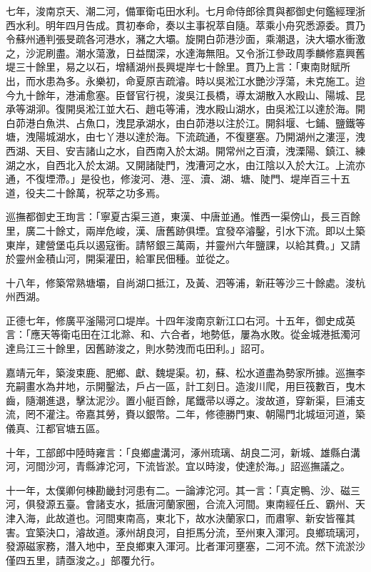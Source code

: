 七年，浚南京天、潮二河，備軍衛屯田水利。七月命侍郎徐貫與都御史何鑑經理浙西水利。明年四月告成。貫初奉命，奏以主事祝萃自隨。萃乘小舟究悉源委。貫乃令蘇州通判張旻疏各河港水，瀦之大壩。旋開白茆港沙面，乘潮退，決大壩水衝激之，沙泥刷盡。潮水蕩激，日益闊深，水達海無阻。又令浙江參政周季麟修嘉興舊堤三十餘里，易之以石，增繕湖州長興堤岸七十餘里。貫乃上言：「東南財賦所出，而水患為多。永樂初，命夏原吉疏濬。時以吳淞江水艷沙浮蕩，未克施工。迨今九十餘年，港浦愈塞。臣督官行視，浚吳江長橋，導太湖散入水殿山、陽城、昆承等湖泖。復開吳淞江並大石、趙屯等浦，洩水殿山湖水，由吳淞江以達於海。開白茆港白魚洪、占魚口，洩昆承湖水，由白茆港以注於江。開斜堰、七鋪、鹽鐵等塘，洩陽城湖水，由七丫港以達於海。下流疏通，不復壅塞。乃開湖州之漊涇，洩西湖、天目、安吉諸山之水，自西南入於太湖。開常州之百瀆，洩溧陽、鎮江、練湖之水，自西北入於太湖。又開諸陡門，洩漕河之水，由江陰以入於大江。上流亦通，不復堙滯。」是役也，修浚河、港、涇、瀆、湖、塘、陡門、堤岸百三十五道，役夫二十餘萬，祝萃之功多焉。

巡撫都御史王珣言：「寧夏古渠三道，東漢、中唐並通。惟西一渠傍山，長三百餘里，廣二十餘丈，兩岸危峻，漢、唐舊跡俱堙。宜發卒濬鑿，引水下流。即以土築東岸，建營堡屯兵以遏寇衝。請帑銀三萬兩，并靈州六年鹽課，以給其費。」又請於靈州金積山河，開渠灌田，給軍民佃種。並從之。

十八年，修築常熟塘壩，自尚湖口抵江，及黃、泗等浦，新莊等沙三十餘處。浚杭州西湖。

正德七年，修廣平滏陽河口堤岸。十四年浚南京新江口右河。十五年，御史成英言：「應天等衛屯田在江北滁、和、六合者，地勢低，屢為水敗。從金城港抵濁河達烏江三十餘里，因舊跡浚之，則水勢洩而屯田利。」詔可。

嘉靖元年，築浚束鹿、肥鄉、獻、魏堤渠。初，蘇、松水道盡為勢家所據。巡撫李充嗣畫水為井地，示開鑿法，戶占一區，計工刻日。造浚川爬，用巨筏數百，曳木齒，隨潮進退，擊汰泥沙。置小艇百餘，尾鐵帚以導之。浚故道，穿新渠，巨浦支流，罔不灌注。帝嘉其勞，賚以銀幣。二年，修德勝門東、朝陽門北城垣河道，築儀真、江都官塘五區。

十年，工部郎中陸時雍言：「良鄉盧溝河，涿州琉璃、胡良二河，新城、雄縣白溝河，河間沙河，青縣滹沱河，下流皆淤。宜以時浚，使達於海。」詔巡撫議之。

十一年，太僕卿何棟勘畿封河患有二。一論滹沱河。其一言：「真定鴨、沙、磁三河，俱發源五臺。會諸支水，抵唐河蘭家圈，合流入河間。東南經任丘、霸州、天津入海，此故道也。河間東南高，東北下，故水決蘭家口，而肅寧、新安皆罹其害。宜築決口，濬故道。涿州胡良河，自拒馬分流，至州東入渾河。良鄉琉璃河，發源磁家務，潛入地中，至良鄉東入渾河。比者渾河壅塞，二河不流。然下流淤沙僅四五里，請亟浚之。」部覆允行。


